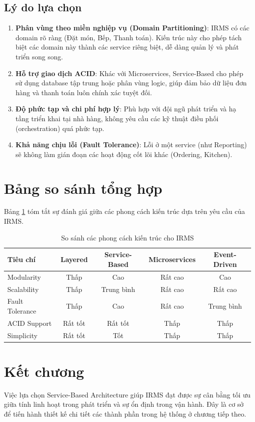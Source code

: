 \subsection{Lý do lựa chọn}
\begin{enumerate}
    \item \textbf{Phân vùng theo miền nghiệp vụ (Domain Partitioning)}: IRMS có các domain rõ ràng (Đặt món, Bếp, Thanh toán). Kiến trúc này cho phép tách biệt các domain này thành các service riêng biệt, dễ dàng quản lý và phát triển song song.
    \item \textbf{Hỗ trợ giao dịch ACID}: Khác với Microservices, Service-Based cho phép sử dụng database tập trung hoặc phân vùng logic, giúp đảm bảo dữ liệu đơn hàng và thanh toán luôn chính xác tuyệt đối.
    \item \textbf{Độ phức tạp và chi phí hợp lý}: Phù hợp với đội ngũ phát triển và hạ tầng triển khai tại nhà hàng, không yêu cầu các kỹ thuật điều phối (orchestration) quá phức tạp.
    \item \textbf{Khả năng chịu lỗi (Fault Tolerance)}: Lỗi ở một service (như Reporting) sẽ không làm gián đoạn các hoạt động cốt lõi khác (Ordering, Kitchen).
\end{enumerate}

\section{Bảng so sánh tổng hợp}

Bảng \ref{tab:arch_comparison} tóm tắt sự đánh giá giữa các phong cách kiến trúc dựa trên yêu cầu của IRMS.

\begin{table}[H]
\centering
\caption{So sánh các phong cách kiến trúc cho IRMS}
\label{tab:arch_comparison}
\begin{tabularx}{\textwidth}{|l|c|c|c|c|}
\hline
\textbf{Tiêu chí} & \textbf{Layered} & \textbf{Service-Based} & \textbf{Microservices} & \textbf{Event-Driven} \\ \hline
Modularity & Thấp & Cao & Rất cao & Cao \\ \hline
Scalability & Thấp & Trung bình & Rất cao & Rất cao \\ \hline
Fault Tolerance & Thấp & Cao & Rất cao & Trung bình \\ \hline
ACID Support & Rất tốt & Rất tốt & Thấp & Thấp \\ \hline
Simplicity & Rất tốt & Tốt & Thấp & Thấp \\ \hline
\end{tabularx}
\end{table}

\section{Kết chương}
Việc lựa chọn Service-Based Architecture giúp IRMS đạt được sự cân bằng tối ưu giữa tính linh hoạt trong phát triển và sự ổn định trong vận hành. Đây là cơ sở để tiến hành thiết kế chi tiết các thành phần trong hệ thống ở chương tiếp theo.
